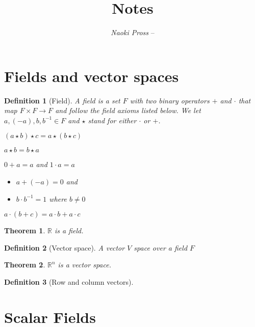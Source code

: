 \documentclass[twocolumn, margin=normal]{tex/hsrzf}
\author{\textsl{Naoki Pross} -- \texttt{\theauthoremail}}
\title{\texttt{\themodule} Notes}
\date{\thesemester}
\newcommand\Rset{\mathbb{R}}
\theoremstyle{fuvarzf}
\newtheorem{theorem}{Theorem}
\newtheorem{definition}{Definition}
\begin{document}
\maketitle
\tableofcontents

\section{Fields and vector spaces}
\begin{definition}[Field]
  A field is a set \(F\) with two binary operators \(+\) and \(\cdot\) that map
  \(F\times F \to F\) and follow the \emph{field axioms} listed below. We let 
  \(a, (-a), b, b^{-1} \in F\) and \(\star\) stand for either \(\cdot\) or \(+\).
  \begin{description}[leftmargin=2.5cm]
    \item[Associativity] \((a \star b) \star c = a \star (b \star c)\)
    \item[Commutativity] \(a \star b = b \star a\) 
    \item[Identities] \(0 + a = a\) and \(1\cdot a = a\)
    \item[Inverses]
      \begin{itemize}
        \item \(a + (-a) = 0\) and 
        \item \(b \cdot b^{-1} = 1\) where \(b \neq 0\)
      \end{itemize}
    \item[Distributivity] \(a \cdot (b + c) = a\cdot b + a \cdot c\)
  \end{description}
\end{definition}

\begin{theorem}
  \(\Rset\) is a field.
\end{theorem}

\begin{definition}[Vector space]
  A vector \(V\) space over a field \(F\)
\end{definition}

\begin{theorem}
  \(\Rset^n\) is a vector space.
\end{theorem}

\begin{definition}[Row and column vectors]
\end{definition}

\section{Scalar Fields}
\end{document}

